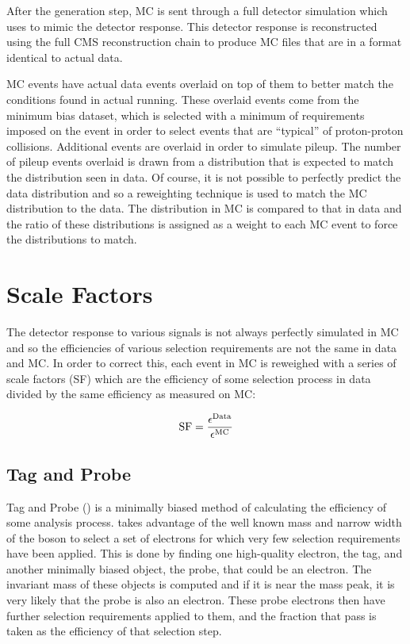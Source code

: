 After the generation step, MC is sent through a full detector simulation which
uses \GEANTfour \cite{agostinelli2003} to mimic the detector response. This
detector response is reconstructed using the full CMS reconstruction chain to
produce MC files that are in a format identical to actual data.

MC events have actual data events overlaid on top of them to better match the
conditions found in actual running. These overlaid events come from the minimum
bias dataset, which is selected with a minimum of requirements imposed on the
event in order to select events that are ``typical'' of proton-proton
collisions. Additional events are overlaid in order to simulate pileup. The
number of pileup events overlaid is drawn from a distribution that is expected
to match the distribution seen in data. Of course, it is not possible to
perfectly predict the data distribution and so a reweighting technique is used
to match the MC distribution to the data. The distribution in MC is compared to
that in data and the ratio of these distributions is assigned as a weight to
each MC event to force the distributions to match.

\section{Scale Factors}

The detector response to various signals is not always perfectly simulated in
MC and so the efficiencies of various selection requirements are not the same
in data and MC. In order to correct this, each event in MC is reweighed with a
series of scale factors (SF) which are the efficiency of some selection process
in data divided by the same efficiency as measured on MC:

\begin{equation}
    \label{eq:sf}
    \text{SF} = \frac{\epsilon^{\text{Data}}}{\epsilon^{\text{MC}}}
\end{equation}

\subsection{Tag and Probe}

Tag and Probe (\TnP) is a minimally biased method of calculating the efficiency
of some analysis process. \TnP takes advantage of the well known mass and
narrow width of the \Z boson to select a set of electrons for which very few
selection requirements have been applied. This is done by finding one
high-quality electron, the tag, and another minimally biased object, the probe,
that could be an electron. The invariant mass of these objects is computed and
if it is near the \Z mass peak, it is very likely that the probe is also an
electron. These probe electrons then have further selection requirements
applied to them, and the fraction that pass is taken as the efficiency of that
selection step.

